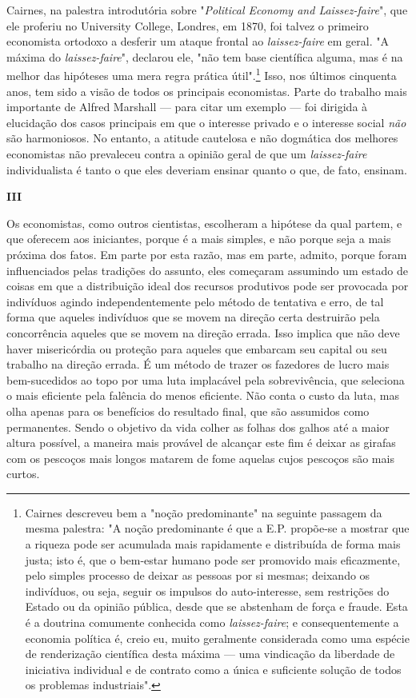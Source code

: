 \documentclass[12pt]{article}
\begin{document}
Cairnes, na palestra introdutória sobre "\textit{Political Economy and Laissez-faire}", que ele proferiu no University College, Londres, em 1870, foi talvez o primeiro economista ortodoxo a desferir um ataque frontal ao \textit{laissez-faire} em geral. "A máxima do \textit{laissez-faire}", declarou ele, "não tem base científica alguma, mas é na melhor das hipóteses uma mera regra prática útil".\footnote{Cairnes descreveu bem a "noção predominante" na seguinte passagem da mesma palestra: "A noção predominante é que a E.P. propõe-se a mostrar que a riqueza pode ser acumulada mais rapidamente e distribuída de forma mais justa; isto é, que o bem-estar humano pode ser promovido mais eficazmente, pelo simples processo de deixar as pessoas por si mesmas; deixando os indivíduos, ou seja, seguir os impulsos do auto-interesse, sem restrições do Estado ou da opinião pública, desde que se abstenham de força e fraude. Esta é a doutrina comumente conhecida como \textit{laissez-faire}; e consequentemente a economia política é, creio eu, muito geralmente considerada como uma espécie de renderização científica desta máxima — uma vindicação da liberdade de iniciativa individual e de contrato como a única e suficiente solução de todos os problemas industriais".} Isso, nos últimos cinquenta anos, tem sido a visão de todos os principais economistas. Parte do trabalho mais importante de Alfred Marshall — para citar um exemplo — foi dirigida à elucidação dos casos principais em que o interesse privado e o interesse social \textit{não} são harmoniosos. No entanto, a atitude cautelosa e não dogmática dos melhores economistas não prevaleceu contra a opinião geral de que um \textit{laissez-faire} individualista é tanto o que eles deveriam ensinar quanto o que, de fato, ensinam.

\begin{center}
\textbf{III}
\end{center}

Os economistas, como outros cientistas, escolheram a hipótese da qual partem, e que oferecem aos iniciantes, porque é a mais simples, e não porque seja a mais próxima dos fatos. Em parte por esta razão, mas em parte, admito, porque foram influenciados pelas tradições do assunto, eles começaram assumindo um estado de coisas em que a distribuição ideal dos recursos produtivos pode ser provocada por indivíduos agindo independentemente pelo método de tentativa e erro, de tal forma que aqueles indivíduos que se movem na direção certa destruirão pela concorrência aqueles que se movem na direção errada. Isso implica que não deve haver misericórdia ou proteção para aqueles que embarcam seu capital ou seu trabalho na direção errada. É um método de trazer os fazedores de lucro mais bem-sucedidos ao topo por uma luta implacável pela sobrevivência, que seleciona o mais eficiente pela falência do menos eficiente. Não conta o custo da luta, mas olha apenas para os benefícios do resultado final, que são assumidos como permanentes. Sendo o objetivo da vida colher as folhas dos galhos até a maior altura possível, a maneira mais provável de alcançar este fim é deixar as girafas com os pescoços mais longos matarem de fome aquelas cujos pescoços são mais curtos.
\end{document}
